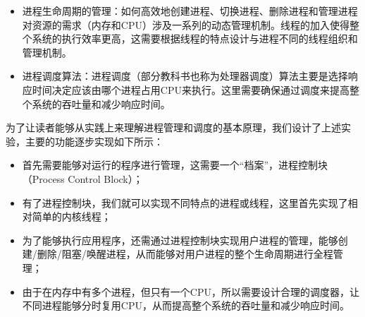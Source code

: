 \begin{itemize}
\tightlist
\item
  进程生命周期的管理：如何高效地创建进程、切换进程、删除进程和管理进程对资源的需求（内存和CPU）涉及一系列的动态管理机制。线程的加入使得整个系统的执行效率更高，这需要根据线程的特点设计与进程不同的线程组织和管理机制。
\item
  进程调度算法：进程调度（部分教科书也称为处理器调度）算法主要是选择响应时间决定应该由哪个进程占用CPU来执行。这里需要确保通过调度来提高整个系统的吞吐量和减少响应时间。
\end{itemize}

为了让读者能够从实践上来理解进程管理和调度的基本原理，我们设计了上述实验，主要的功能逐步实现如下所示：

\begin{itemize}
\tightlist
\item
  首先需要能够对运行的程序进行管理，这需要一个``档案''，进程控制块（Process
  Control Block）；
\item
  有了进程控制块，我们就可以实现不同特点的进程或线程，这里首先实现了相对简单的内核线程；
\item
  为了能够执行应用程序，还需通过进程控制块实现用户进程的管理，能够创建/删除/阻塞/唤醒进程，从而能够对用户进程的整个生命周期进行全程管理；
\item
  由于在内存中有多个进程，但只有一个CPU，所以需要设计合理的调度器，让不同进程能够分时复用CPU，从而提高整个系统的吞吐量和减少响应时间。
\end{itemize}
